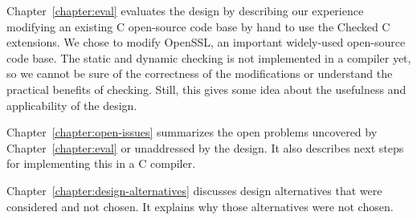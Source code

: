 Chapter~\ref{chapter:eval} evaluates the design by describing our experience modifying
an existing C open-source code base by hand to use the Checked C
extensions. We chose to modify OpenSSL, an important widely-used
open-source code base. The static and dynamic checking is not
implemented in a compiler yet, so we cannot be sure of the correctness
of the modifications or understand the practical benefits of checking.
Still, this gives some idea about the usefulness and applicability of
the design.

Chapter~\ref{chapter:open-issues} summarizes the open problems uncovered by 
Chapter~\ref{chapter:eval} or
unaddressed by the design. It also describes next steps for implementing
this in a C compiler.

Chapter~\ref{chapter:design-alternatives} discusses design alternatives
that were considered and not chosen.  It explains why those alternatives were
not chosen.
